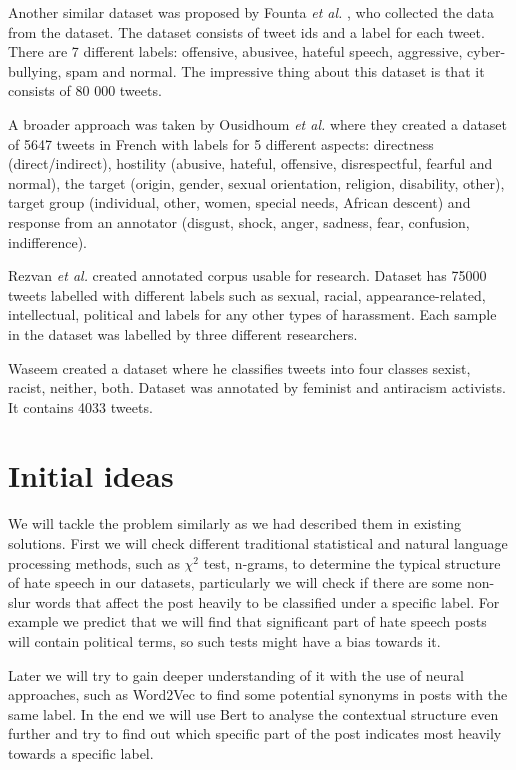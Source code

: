 \documentclass[fleqn,moreauthors,10pt]{ds_report}
\begin{document}
Another similar dataset was proposed by Founta \textit{et al.} \cite{twitter-dataset}, who collected the data from the dataset. The dataset consists of tweet ids and a label for each tweet. There are 7 different labels: offensive, abusivee, hateful speech, aggressive, cyber-bullying, spam and normal. The impressive thing about this dataset is that it consists of 80 000 tweets.

A broader approach was taken by Ousidhoum \textit{et al.} \cite{mlma-dataset} where they created a dataset of 5647 tweets in French with labels for 5 different aspects: directness (direct/indirect), hostility (abusive, hateful, offensive, disrespectful, fearful and normal), the target (origin, gender, sexual orientation, religion, disability, other), target group (individual, other, women, special needs, African descent) and response from an annotator (disgust, shock, anger, sadness, fear, confusion, indifference).

Rezvan \textit{et al.} \cite{Harassment-dataset32} created annotated corpus usable for research. Dataset has 75000 tweets labelled with different labels such as sexual, racial, appearance-related, intellectual, political and labels for any other types of harassment. Each sample in the dataset was labelled by three different researchers.

Waseem \cite{Waseem2016AreYA}  created a dataset where he classifies tweets into four classes sexist, racist, neither, both. Dataset was annotated by feminist and antiracism activists. It contains 4033 tweets. 

\section*{Initial ideas}


We will tackle the problem similarly as we had described them in existing solutions. First we will check different traditional statistical and natural language processing methods, such as $\chi^2$ test, n-grams, to determine the typical structure of hate speech in our datasets, particularly we will check if there are some non-slur words that affect the post heavily to be classified under a specific label. For example we predict that we will find that significant part of hate speech posts will contain political terms, so such tests might have a bias towards it.

Later we will try to gain deeper understanding of it with the use of neural approaches, such as Word2Vec to find some potential synonyms in posts with the same label. In the end we will use Bert to analyse the contextual structure even further and try to find out which specific part of the post indicates most heavily towards a specific label. 
\end{document}

